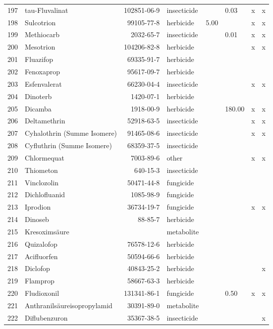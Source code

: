 \begin{longtable}{lp{4cm}rlp{1cm}p{1.5cm}p{1.5cm}p{1cm}}
  197 & tau-Fluvalinat & 102851-06-9 & insecticide &  & 0.03 & x & x \\ 
  198 & Sulcotrion & 99105-77-8 & herbicide & 5.00 &  & x & x \\ 
  199 & Methiocarb & 2032-65-7 & insecticide &  & 0.01 & x & x \\ 
  200 & Mesotrion & 104206-82-8 & herbicide &  &  & x & x \\ 
  201 & Fluazifop & 69335-91-7 & herbicide &  &  &  &  \\ 
  202 & Fenoxaprop & 95617-09-7 & herbicide &  &  &  &  \\ 
  203 & Esfenvalerat & 66230-04-4 & insecticide &  &  & x & x \\ 
  204 & Dinoterb & 1420-07-1 & herbicide &  &  &  &  \\ 
  205 & Dicamba & 1918-00-9 & herbicide &  & 180.00 & x & x \\ 
  206 & Deltamethrin & 52918-63-5 & insecticide &  &  & x & x \\ 
  207 & Cyhalothrin (Summe Isomere) & 91465-08-6 & insecticide &  &  & x & x \\ 
  208 & Cyfluthrin (Summe Isomere) & 68359-37-5 & insecticide &  &  &  &  \\ 
  209 & Chlormequat & 7003-89-6 & other &  &  & x & x \\ 
  210 & Thiometon & 640-15-3 & insecticide &  &  &  &  \\ 
  211 & Vinclozolin & 50471-44-8 & fungicide &  &  &  &  \\ 
  212 & Dichlofluanid & 1085-98-9 & fungicide &  &  &  &  \\ 
  213 & Iprodion & 36734-19-7 & fungicide &  &  & x & x \\ 
  214 & Dinoseb & 88-85-7 & herbicide &  &  &  &  \\ 
  215 & Kresoximsäure &  & metabolite &  &  &  &  \\ 
  216 & Quizalofop & 76578-12-6 & herbicide &  &  &  &  \\ 
  217 & Acifluorfen & 50594-66-6 & herbicide &  &  &  &  \\ 
  218 & Diclofop & 40843-25-2 & herbicide &  &  &  & x \\ 
  219 & Flamprop & 58667-63-3 & herbicide &  &  &  &  \\ 
  220 & Fludioxonil & 131341-86-1 & fungicide &  & 0.50 & x & x \\ 
  221 & Anthranilsäureisopropylamid & 30391-89-0 & metabolite &  &  &  &  \\ 
  222 & Diflubenzuron & 35367-38-5 & insecticide &  &  &  & x \\ 

\end{longtable}
